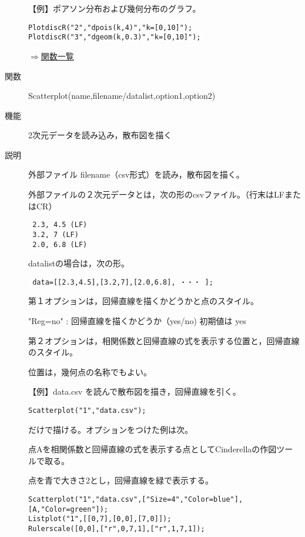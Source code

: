 \documentclass[papersize,a4paper,10pt,uplatex]{jsarticle}
\begin{document}
\begin{description}
【例】ポアソン分布および幾何分布のグラフ。
\begin{verbatim}
PlotdiscR("2","dpois(k,4)","k=[0,10]");
PlotdiscR("3","dgeom(k,0.3)","k=[0,10]");
\end{verbatim}
\begin{flushright}\hyperlink{functionlist}{$\Rightarrow$関数一覧}\end{flushright}

\vspace{\baselineskip}
\hypertarget{scatterplot}{}
\item[関数]Scatterplot(name,filename/datalist,option1,option2)
\item[機能]2次元データを読み込み，散布図を描く
\item[説明]外部ファイル filename（csv形式）を読み，散布図を描く。

外部ファイルの２次元データとは，次の形のcsvファイル。（行末はLFまたはCR）
\begin{verbatim}
 2.3, 4.5 (LF)
 3.2, 7 (LF)
 2.0, 6.8 (LF)
\end{verbatim}


datalistの場合は，次の形。

\begin{verbatim}
 data=[[2.3,4.5],[3.2,7],[2.0,6.8], ・・・ ];
\end{verbatim}


第１オプションは，回帰直線を描くかどうかと点のスタイル。

"Reg=no" : 回帰直線を描くかどうか（yes/no) 初期値は yes

第２オプションは，相関係数と回帰直線の式を表示する位置と，回帰直線のスタイル。

位置は，幾何点の名称でもよい。

\vspace{\baselineskip}
【例】data.csv を読んで散布図を描き，回帰直線を引く。
\begin{verbatim}
Scatterplot("1","data.csv");
\end{verbatim}

だけで描ける。オプションをつけた例は次。

点Aを相関係数と回帰直線の式を表示する点としてCinderellaの作図ツールで取る。

点を青で大きさ2とし，回帰直線を緑で表示する。

\begin{verbatim}
Scatterplot("1","data.csv",["Size=4","Color=blue"],[A,"Color=green"]);
Listplot("1",[[0,7],[0,0],[7,0]]);
Rulerscale([0,0],["r",0,7,1],["r",1,7,1]);
\end{verbatim}
 
\vspace{\baselineskip}
 \begin{center}  \end{center}

\end{description}
\end{document}

